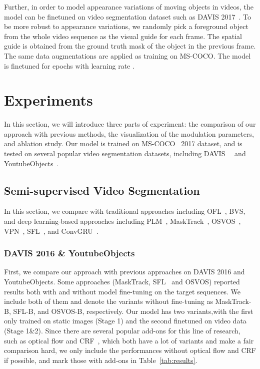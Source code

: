 \documentclass[10pt,twocolumn,letterpaper]{article}
\begin{document}
Further, in order to model appearance variations of moving objects in videos, the model can be finetuned on video segmentation dataset such as DAVIS 2017~\cite{Pont-Tuset2017davis}. To be more robust to appearance variations, we randomly pick a foreground object from the whole video sequence as the visual guide for each frame. The spatial guide is obtained from the ground truth mask of the object in the previous frame. The same data augmentations are applied as training on MS-COCO. The model is finetuned for  epochs with learning rate .



\section{Experiments}

In this section, we will introduce three parts of experiment: the comparison of our approach with previous methods, the visualization of the modulation parameters, and ablation study. Our model is trained on MS-COCO~\cite{Lin2014mscoco} 2017 dataset, and is tested on several popular video segmentation datasets, including DAVIS~\cite{Perazzi2016davis}~\cite{Pont-Tuset2017davis} and YoutubeObjects~\cite{Jain2014youtube}.

\subsection{Semi-supervised Video Segmentation}
In this section, we compare with traditional approaches including OFL~\cite{Tsai2016objflow}, BVS\cite{Marki2016bilateral}, and deep learning-based approaches including PLM~\cite{Shin2017pixel}, MaskTrack~\cite{Perazzi2017masktrack}, OSVOS~\cite{Caelles2017osvos}, VPN~\cite{Jampani2017vpn}, SFL~\cite{Cheng2017segflow}, and ConvGRU~\cite{Tokmakov2017memory}. 

\subsubsection{DAVIS 2016 \& YoutubeObjects}
First, we compare our approach with previous approaches on DAVIS 2016 and YoutubeObjects. Some approaches (MaskTrack\cite{Perazzi2017masktrack}, SFL~\cite{Cheng2017segflow} and OSVOS\cite{Caelles2017osvos}) reported results both with and without model fine-tuning on the target sequences. We include both of them and denote the variants without fine-tuning as MaskTrack-B, SFL-B, and OSVOS-B, respectively. Our model has two variants,with the first only trained on static images (Stage 1) and the second finetuned on video data (Stage 1\&2). Since there are several popular add-ons for this line of research, such as optical flow and CRF~\cite{Krahenbuhl2011crf}, which both have a lot of variants and make a fair comparison hard, we only include the performances without optical flow and CRF if possible, and mark those with add-ons in Table~\ref{tab:results}. 
\end{document}
